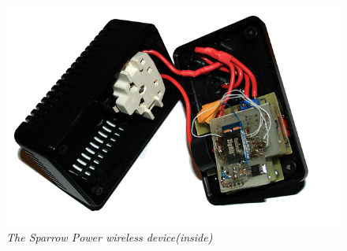 \begin{figure}[ht]
\begin{center}
\includegraphics[scale=0.5]{hw_platform/sparrowpower2.png}
\end{center}
\caption{\small \itshape{The Sparrow Power wireless device(inside)}}
\end{figure}
